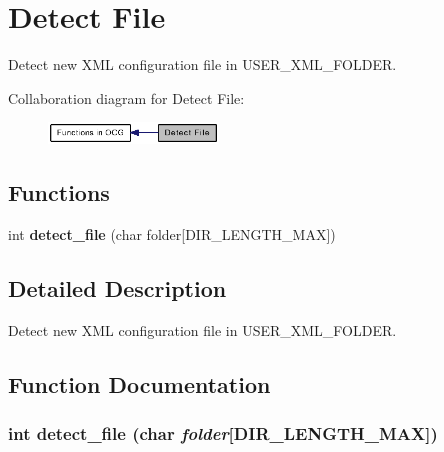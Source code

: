 \section{Detect File}
\label{group____detect__file}
Detect new XML configuration file in USER\_\-XML\_\-FOLDER.  




Collaboration diagram for Detect File:\nopagebreak
\begin{figure}[H]
\begin{center}
\leavevmode
\includegraphics[width=128pt]{group____detect__file}
\end{center}
\end{figure}
\subsection*{Functions}
\begin{CompactItemize}
\item 
int {\bf detect\_\-file} (char folder[DIR\_\-LENGTH\_\-MAX])
\end{CompactItemize}


\subsection{Detailed Description}
Detect new XML configuration file in USER\_\-XML\_\-FOLDER. 

\subsection{Function Documentation}
\subsubsection[{detect\_\-file}]{\setlength{\rightskip}{0pt plus 5cm}int detect\_\-file (char {\em folder}[DIR\_\-LENGTH\_\-MAX])}\label{group____detect__file_g4f23aa705922bf0009ce6810b0e44c20}


